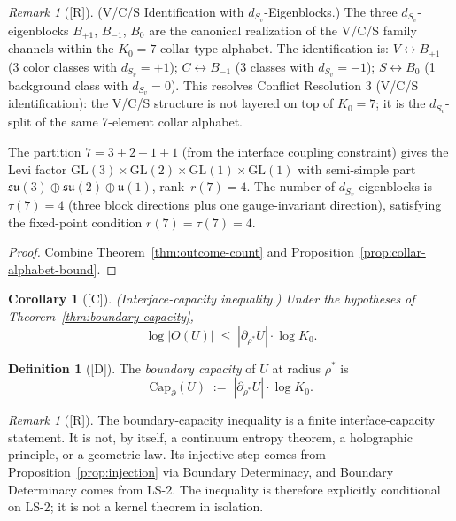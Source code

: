 \documentclass[12pt,oneside]{amsbook}
\theoremstyle{plain}
\newtheorem{corollary}[theorem]{Corollary}
\theoremstyle{definition}
\newtheorem{definition}[theorem]{Definition}
\theoremstyle{remark}
\newtheorem{remark}[theorem]{Remark}
\newcommand{\status}[1]{\textup{[#1]}}
\begin{document}
\begin{remark}[\status{R}]\label{rem:dSv-vcs-identification}
\textup{(V/C/S Identification with $d_{S_v}$-Eigenblocks.)}
The three $d_{S_v}$-eigenblocks $B_{+1}$, $B_{-1}$, $B_0$ are
the canonical realization of the V/C/S family channels within the
$K_0=7$ collar type alphabet.  The identification is:
$V \leftrightarrow B_{+1}$ (3 color classes with $d_{S_v}=+1$);
$C \leftrightarrow B_{-1}$ (3 classes with $d_{S_v}=-1$);
$S \leftrightarrow B_0$ (1 background class with $d_{S_v}=0$).
This resolves Conflict Resolution 3 (V/C/S identification):
the V/C/S structure is not layered on top of $K_0=7$; it is the
$d_{S_v}$-split of the same 7-element collar alphabet.

The partition $7 = 3+2+1+1$ (from the interface coupling
constraint) gives the Levi factor
$\mathrm{GL}(3)\times\mathrm{GL}(2)\times\mathrm{GL}(1)\times
\mathrm{GL}(1)$ with semi-simple part
$\mathfrak{su}(3)\oplus\mathfrak{su}(2)\oplus\mathfrak{u}(1)$,
rank~$r(7)=4$.  The number of $d_{S_v}$-eigenblocks is $\tau(7)=4$
(three block directions plus one gauge-invariant direction),
satisfying the fixed-point condition $r(7)=\tau(7)=4$.
\end{remark}

\begin{proof}
Combine Theorem~\ref{thm:outcome-count} and
Proposition~\ref{prop:collar-alphabet-bound}.
\end{proof}

\begin{corollary}[\status{C}]\label{cor:log-interface}
\textup{(Interface-capacity inequality.)}  Under the hypotheses of
Theorem~\ref{thm:boundary-capacity},
\[
  \log |O(U)| \;\leq\; |\partial_{\rho^*} U| \cdot \log K_0.
\]
\end{corollary}

\begin{definition}[\status{D}]\label{def:boundary-capacity}
The \emph{boundary capacity} of $U$ at radius $\rho^*$ is
\[
  \mathrm{Cap}_\partial(U) \;:=\; |\partial_{\rho^*} U| \cdot \log K_0.
\]
\end{definition}

\begin{remark}[\status{R}]\label{rmk:capacity-not-holographic}
The boundary-capacity inequality is a finite interface-capacity
statement.  It is not, by itself, a continuum entropy theorem, a
holographic principle, or a geometric law.  Its injective step comes
from Proposition~\ref{prop:injection} via Boundary Determinacy, and
Boundary Determinacy comes from LS-2.  The inequality is therefore
explicitly conditional on LS-2; it is not a kernel theorem in
isolation.
\end{remark}
\end{document}
